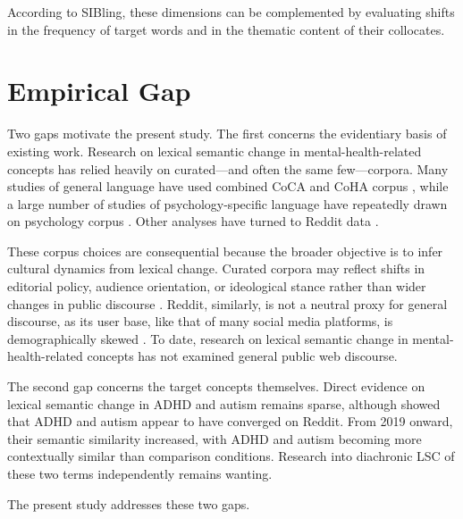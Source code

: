 According to SIBling, these dimensions can be complemented by evaluating shifts in the frequency of target words and in the thematic content of their collocates.

\section{Empirical Gap}

Two gaps motivate the present study. The first concerns the evidentiary basis of existing work. Research on lexical semantic change in mental-health-related concepts has relied heavily on curated---and often the same few---corpora. Many studies of general language have used \citet{vylomovaSemanticChangesHarmrelated2021} combined CoCA and CoHA corpus \citep{baesSemanticShiftsMental2023,baesMultidimensionalFrameworkEvaluating2024,xiaoHaveConceptsAnxiety2023}, while a large number of studies of psychology-specific language have repeatedly drawn on \citet{vylomovaSemanticChangesHarmrelated2021} psychology corpus \citep{baesMultidimensionalFrameworkEvaluating2024,baesSemanticShiftsMental2023,xiaoHaveConceptsAnxiety2023,iacobComputationalAnalysisEmergence2026}. Other analyses have turned to Reddit data \citep{kangConvergingRepresentationsAttentionDeficit2025,iacobComputationalAnalysisEmergence2026}.

These corpus choices are consequential because the broader objective is to infer cultural dynamics from lexical change. Curated corpora may reflect shifts in editorial policy, audience orientation, or ideological stance rather than wider changes in public discourse \citep{pislRevisitingSemanticSeverity2025}. Reddit, similarly, is not a neutral proxy for general discourse, as its user base, like that of many social media platforms, is demographically skewed \citep{gjurkovicPANDORATalksPersonality2021}. To date, research on lexical semantic change in mental-health-related concepts has not examined general public web discourse.

The second gap concerns the target concepts themselves. Direct evidence on lexical semantic change in ADHD and autism remains sparse, although \citet{kangConvergingRepresentationsAttentionDeficit2025} showed that ADHD and autism appear to have converged on Reddit. From 2019 onward, their semantic similarity increased, with ADHD and autism becoming more contextually similar than comparison conditions. Research into diachronic LSC of these two terms independently remains wanting.

The present study addresses these two gaps.

